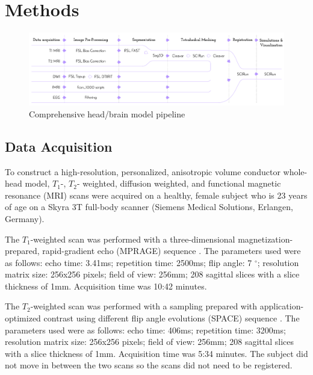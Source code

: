 
\section{Methods}
\label{sec:Methods}

\begin{figure}[H]
    \centering
    \includegraphics[width=\textwidth]{Figures/pipeline}
    \caption{Comprehensive head/brain model pipeline}
    \label{fig:pipeline}
\end{figure}

\subsection{Data Acquisition}
\label{sec:Data}


To construct a high-resolution, personalized, anisotropic volume conductor whole-head model, $T_1$-, $T_2$- weighted, diffusion weighted, and functional magnetic resonance (MRI) scans were acquired on a healthy, female subject who is 23 years of age on a Skyra 3T full-body scanner (Siemens Medical Solutions, Erlangen, Germany). 

The $T_1$-weighted scan was performed with a three-dimensional magnetization-prepared, rapid-gradient echo (MPRAGE) sequence \cite{ref:mprage}. The parameters used were as follows: echo time: 3.41ms; repetition time: 2500ms; flip angle: 7 $^{\circ}$; resolution matrix size: 256x256 pixels; field of view: 256mm; 208 sagittal slices with a slice thickness of 1mm. Acquisition time was 10:42 minutes. 

The $T_2$-weighted scan was performed with a sampling prepared with application-optimized contrast using different flip angle evolutions (SPACE) sequence \cite{ref:space}. The parameters used were as follows: echo time: 406ms; repetition time: 3200ms; resolution matrix size: 256x256 pixels; field of view: 256mm; 208 sagittal slices with a slice thickness of 1mm. Acquisition time was 5:34 minutes. The subject did not move in between the two scans so the scans did not need to be registered. 

